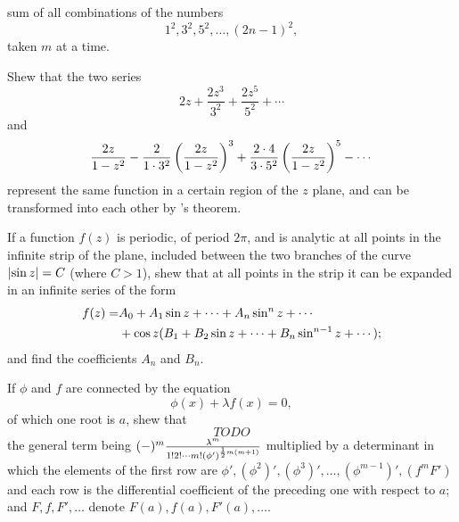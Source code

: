 \begin{wandwmiscexamples}
\begin{wandwmiscexample}
    sum of all combinations of the numbers
    $$
    1^{2}, 3^{2}, 5^{2}, \ldots, (2n-1)^{2},
    $$
    taken $m$ at a time.
  \end{wandwmiscexample}
  \begin{wandwmiscexample}
    Shew that the two series
    $$
    2z
    + \frac{2 z^{3}}{3^{2}}
    + \frac{2 z^{5}}{5^{2}}
    + \cdots
    $$
    and
    $$
    \frac{2z}{1 - z^{2}}
    -
    \frac{2}{1 \cdot 3^{2}}
    \left( 
      \frac{2z}{1 - z^{2}}
     \right)^{3}
    +
    \frac{2 \cdot 4}{3 \cdot 5^{2}}
    \left( 
      \frac{2z}{1 - z^{2}}
     \right)^{5}
    -
    \cdots
    $$
    represent the same function in a certain region of the $z$ plane,
    and can be transformed into each other by \Burmann's theorem.

  \end{wandwmiscexample}
  \begin{wandwmiscexample}
    If a function $f(z)$ is periodic, of period $2 \pi$, and is
    analytic at all points in the infinite strip of the plane,
    included between the two branches of the curve
    $\left| \sin z \right| = C$ (where $C > 1$),
    shew that at all points in the strip it can be expanded in
    an infinite series of the form
    \begin{align*}
      f(z)
      =&
      A_{0} + A_{1} \sin z + \cdots + A_{n} \sin^{n} z + \cdots
      \\
      &
      \hfill
      + \cos z
      ( B_{1} + B_{2} \sin z + \cdots + B_{n} \sin^{n-1} z + \cdots );
    \end{align*}
    and find the coefficients
    $A_{n}$ and $B_{n}$.
  \end{wandwmiscexample}
  \begin{wandwmiscexample}
    If $\phi$ and $f$ are connected by the equation
    $$
    \phi(x) + \lambda f(x) = 0,
    $$
    of which one root is $a$,
    shew that
    $$
    TODO
    $$
    the general term being
    $
    (-)^{m}
    \frac{\lambda^{m}}{1! 2! \cdots m! (\phi')^{\frac{1}{2} m(m+1)}}
    $
    multiplied by a determinant in which
    the elements of the first row are
    $\phi', (\phi^{2})', (\phi^{3})', \ldots, (\phi^{m-1})', (f^{m} F')$
    and each row is the differential coefficient of the preceding
    one with respect to $a$; and
    $F, f, F', \ldots$ denote
    $F(a), f(a), F'(a), \ldots$.


\end{wandwmiscexample}
\end{wandwmiscexamples}
